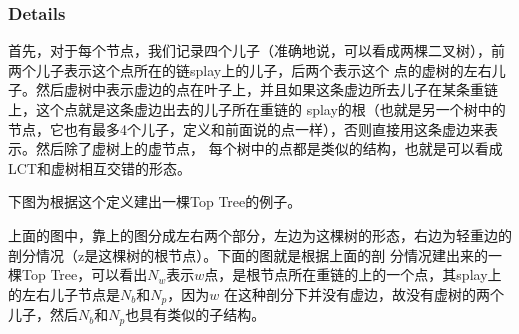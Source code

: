 ﻿\documentclass{article}
\begin{document}
		\subsubsection{Details}
		\indent 首先，对于每个节点，我们记录四个儿子（准确地说，可以看成两棵二叉树），前两个儿子表示这个点所在的链splay上的儿子，后两个表示这个
		点的虚树的左右儿子。然后虚树中表示虚边的点在叶子上，并且如果这条虚边所去儿子在某条重链上，这个点就是这条虚边出去的儿子所在重链的
		splay的根（也就是另一个树中的节点，它也有最多4个儿子，定义和前面说的点一样），否则直接用这条虚边来表示。然后除了虚树上的虚节点，
		每个树中的点都是类似的结构，也就是可以看成LCT和虚树相互交错的形态。\par
		\indent 下图为根据这个定义建出一棵Top Tree的例子。\par
		\begin{figure}[!htbp]
			\centering
		\end{figure}
		\indent 上面的图中，靠上的图分成左右两个部分，左边为这棵树的形态，右边为轻重边的剖分情况（z是这棵树的根节点）。下面的图就是根据上面的剖
		分情况建出来的一棵Top Tree，可以看出$N_w$表示$w$点，是根节点所在重链的上的一个点，其splay上的左右儿子节点是$N_b$和$N_p$，因为$w$
		在这种剖分下并没有虚边，故没有虚树的两个儿子，然后$N_b$和$N_p$也具有类似的子结构。\par
\end{document}
